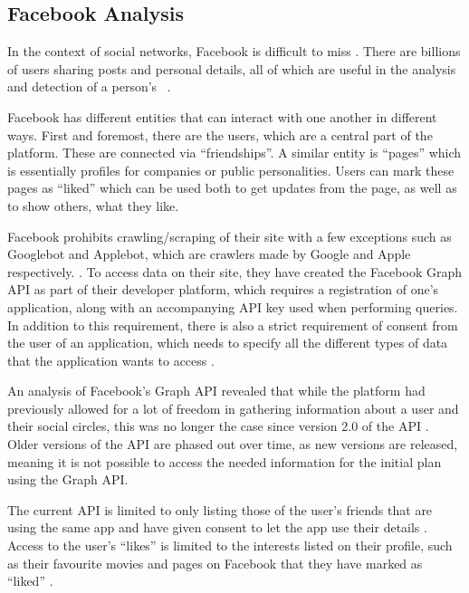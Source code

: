 \subsection{Facebook Analysis}\label{sec:facebook-analysis}
In the context of social networks, Facebook is difficult to miss
\citep{FacebookPopularity}.
There are billions of users sharing posts and personal details, all of which are
useful in the analysis and detection of a person's \fb\ .\nl

Facebook has different entities that can interact with one another in different ways.
First and foremost, there are the users, which are a central part of the
platform. These are connected via ``friendships''.
A similar entity is ``pages'' which is essentially profiles for companies or
public personalities.
Users can mark these pages as ``liked'' which can be used both to get updates
from the page, as well as to show others, what they like.\nl

Facebook prohibits crawling/scraping of their site with a few exceptions such as
Googlebot and Applebot, which are crawlers made by Google and Apple
respectively. \citep{FacebookRobotsTxt}.
To access data on their site, they have created the Facebook Graph \ac{API} as part
of their developer platform, which requires a registration of one's application,
along with an accompanying \ac{API} key used when performing queries.
In addition to this requirement, there is also a strict requirement of consent
from the user of an application, which needs to specify all the different types
of data that the application wants to access \citep{FacebookGraphApiAccessTokens}.\nl

An analysis of Facebook's Graph \ac{API} \citep{FacebookGraphApiDocumentation} revealed that while the platform had
previously allowed for a lot of freedom in gathering information about a user
and their social circles, this was no longer the case since version 2.0 of the
API \citep{FacebookChangesInGraphTwoPointOh}.
Older versions of the \ac{API} are phased out over time, as new versions are released, meaning it is not possible to access
the needed information for the initial plan using the Graph
API.\nl

The current \ac{API} is limited to only listing those of the user's friends that are using the same app and have given
consent to let the app use their details \citep{FacebookChangesInGraphTwoPointOh}.
Access to the user's ``likes'' is limited to the interests listed on their profile, such as their favourite movies and
pages on Facebook that they have marked as ``liked''
\citep{FacebookGraphApiUserLikes} \citep{FacebookGraphApiUserEdges}.\nl

